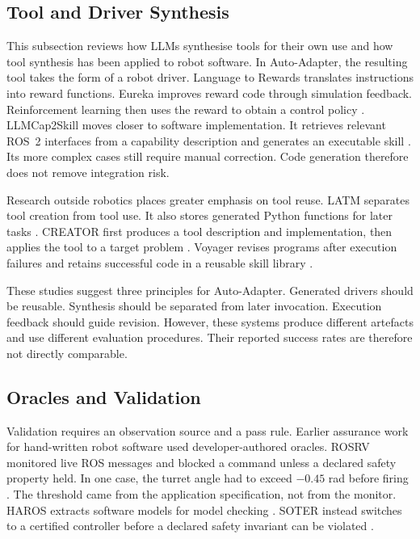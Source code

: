 \subsection{Tool and Driver Synthesis}
\label{sec:tool-driver-synthesis}

This subsection reviews how LLMs synthesise tools for their own use and how
tool synthesis has been applied to robot software. In Auto-Adapter, the
resulting tool takes the form of a robot driver. Language to Rewards translates
instructions into reward functions. Eureka improves reward code through
simulation feedback. Reinforcement learning then uses the reward to obtain a
control policy \citep{yu2023language2reward,ma2024eureka}. LLMCap2Skill moves
closer to software implementation. It retrieves relevant ROS~2 interfaces from
a capability description and generates an executable skill
\citep{vieira2025cap2skill}. Its more complex cases still require manual
correction. Code generation therefore does not remove integration risk.

Research outside robotics places greater emphasis on tool reuse. LATM separates
tool creation from tool use. It also stores generated Python functions for later
tasks \citep{cai2023latm}. CREATOR first produces a tool description and
implementation, then applies the tool to a target problem
\citep{qian2023creator}. Voyager revises programs after execution failures and
retains successful code in a reusable skill library \citep{wang2023voyager}.

These studies suggest three principles for Auto-Adapter. Generated drivers
should be reusable. Synthesis should be separated from later invocation.
Execution feedback should guide revision. However, these systems produce
different artefacts and use different evaluation procedures. Their reported
success rates are therefore not directly comparable.

\subsection{Oracles and Validation}
\label{sec:oracles-validation}

Validation requires an observation source and a pass rule. Earlier assurance
work for hand-written robot software used developer-authored oracles. ROSRV
monitored live ROS messages and blocked a command unless a declared safety
property held. In one case, the turret angle had to exceed \(-0.45\) rad before
firing \citep{huang2014rosrv}. The threshold came from the application
specification, not from the monitor. HAROS extracts software models for model
checking \citep{santos2021haros}. SOTER instead switches to a certified
controller before a declared safety invariant can be violated
\citep{desai2019soter}.

